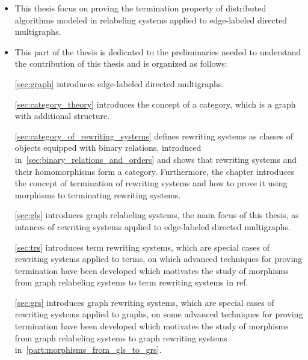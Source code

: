 \begin{itemize}
    \item This thesis focus on proving the termination property of distributed algorithms modeled in relabeling systems applied to edge-labeled directed multigraphs. 
    \item This part of the thesis is dedicated to the preliminaries needed to understand the contribution of this thesis and is organized as follows:
    
    \autoref{sec:graph} introduces edge-labeled directed multigraphs. 
    
    \autoref{sec:category_theory} introduces the concept of a category, which is a graph with additional structure.

    \autoref{sec:category_of_rewriting_systems} defines rewriting systems as classes of objects equipped with binary relations, introduced in~\autoref{sec:binary_relations_and_orders} and shows that rewriting systems and their homomorphisms form a category. Furthermore, the chapter introduces the concept of termination of rewriting systems and how to prove it using morphisms to terminating rewriting systems.

    \autoref{sec:gls} introduces graph relabeling systems, the main focus of this thesis,
     as intances of rewriting systems applied to edge-labeled directed multigraphs.

    \autoref{sec:trs} introduces term rewriting systems, which are special cases of rewriting systems applied to terms, on which advanced techniques for proving termination have been developed which motivates the study of morphisms from graph relabeling systems to term rewriting systems in ref.

    \autoref{sec:grs} introduces graph rewriting systems, which are special cases of rewriting systems applied to graphs, on some advanced techniques for proving termination have been developed which motivates the study of morphisms from graph relabeling systems to graph rewriting systems in~\autoref{part:morphisms_from_gls_to_grs}.

\end{itemize}